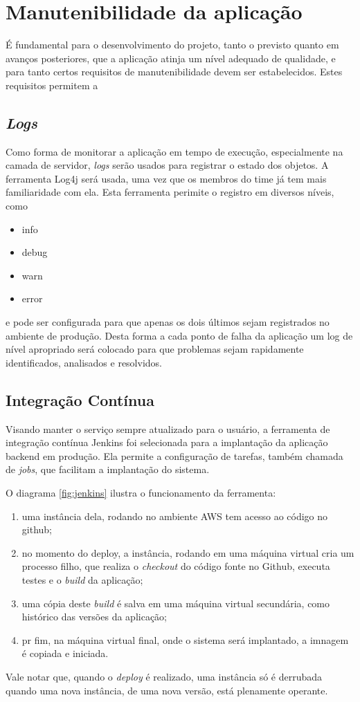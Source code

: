\section{Manutenibilidade da aplicação}

É fundamental para o desenvolvimento do projeto, tanto o previsto
quanto em avanços posteriores, que a aplicação atinja um nível adequado
de qualidade, e para tanto certos requisitos de manutenibilidade devem
ser estabelecidos.  Estes requisitos permitem a

\subsection{\emph{Logs}}

Como forma de monitorar a aplicação em tempo de execução,
especialmente na camada de servidor, \emph{logs} serão usados para
registrar o estado dos objetos. A ferramenta Log4j será usada, uma vez
que os membros do time já tem mais familiaridade com ela. Esta
ferramenta perimite o registro em diversos níveis, como
\begin{itemize}
  \em
\item info
\item debug
\item warn
\item error
\end{itemize}
e pode ser configurada para que apenas os dois últimos
sejam registrados no ambiente de produção. Desta forma a cada ponto de
falha da aplicação um log de nível apropriado será colocado para que
problemas sejam rapidamente identificados, analisados e resolvidos.

\subsection{Integração Contínua}

Visando manter o serviço sempre atualizado para o usuário, a
ferramenta de integração contínua Jenkins foi selecionada para a
implantação da aplicação \gls{backend} em produção. Ela permite a
configuração de tarefas, também chamada de \emph{jobs}, que facilitam
a implantação do sistema.

O diagrama \ref{fig:jenkins} ilustra o funcionamento da ferramenta:
\begin{enumerate}
\item uma instância dela, rodando no ambiente AWS tem acesso ao código no
github;
\item no momento do \gls{deploy}, a instância, rodando em uma máquina
  virtual cria um processo filho, que realiza o \emph{checkout} do
  código fonte no Github, executa testes e o \emph{build} da
  aplicação;
\item uma cópia deste \emph{build} é salva em uma máquina virtual
  secundária, como histórico das versões da aplicação;
\item pr fim, na máquina virtual final, onde o sistema será
  implantado, a imnagem é copiada e iniciada.
\end{enumerate}
Vale notar que, quando o \emph{deploy} é realizado, uma instância só é
derrubada quando uma nova instância, de uma nova versão, está
plenamente operante.

